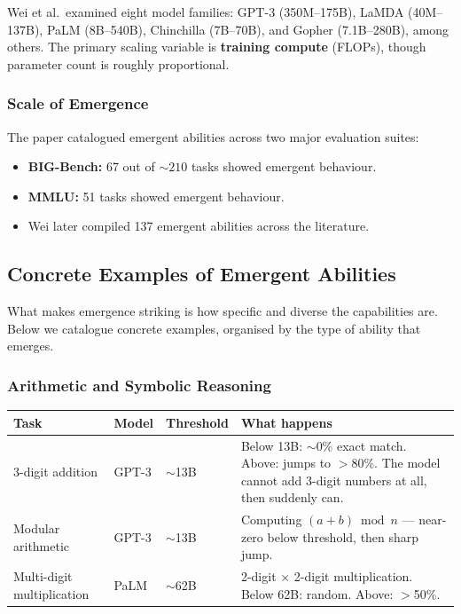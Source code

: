 \documentclass[11pt, a4paper]{article}
\theoremstyle{definition}
\theoremstyle{plain}
\begin{document}
Wei et al.\ examined eight model families: GPT-3 (350M--175B), LaMDA (40M--137B), PaLM (8B--540B), Chinchilla (7B--70B), and Gopher (7.1B--280B), among others. The primary scaling variable is \textbf{training compute} (FLOPs), though parameter count is roughly proportional.

\subsubsection{Scale of Emergence}

The paper catalogued emergent abilities across two major evaluation suites:
\begin{itemize}
  \item \textbf{BIG-Bench:} 67 out of ${\sim}210$ tasks showed emergent behaviour.
  \item \textbf{MMLU:} 51 tasks showed emergent behaviour.
  \item Wei later compiled 137 emergent abilities across the literature.
\end{itemize}

\subsection{Concrete Examples of Emergent Abilities}
\label{subsec:concrete-emergence}

What makes emergence striking is how specific and diverse the capabilities are. Below we catalogue concrete examples, organised by the type of ability that emerges.

\subsubsection{Arithmetic and Symbolic Reasoning}

\begin{center}
\begin{tabular}{p{4cm}llp{5cm}}
  \toprule
  \textbf{Task} & \textbf{Model} & \textbf{Threshold} & \textbf{What happens} \\
  \midrule
  3-digit addition & GPT-3 & ${\sim}$13B & Below 13B: ${\sim}$0\% exact match. Above: jumps to $>$80\%. The model cannot add 3-digit numbers at all, then suddenly can. \\[0.5em]
  Modular arithmetic & GPT-3 & ${\sim}$13B & Computing $(a + b) \bmod n$ --- near-zero below threshold, then sharp jump. \\[0.5em]
  Multi-digit multiplication & PaLM & ${\sim}$62B & 2-digit $\times$ 2-digit multiplication. Below 62B: random. Above: $>$50\%. \\
  \bottomrule
\end{tabular}
\end{center}
\end{document}
